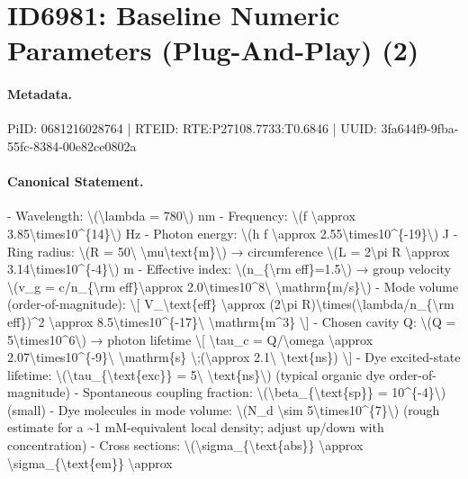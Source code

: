 \section*{ID6981: Baseline Numeric Parameters (Plug-And-Play) (2)}
\paragraph{Metadata.}
PiID: 0681216028764 | RTEID: RTE:P27108.7733:T0.6846 | UUID: 3fa644f9-9fba-55fc-8384-00e82ce0802a

\paragraph{Canonical Statement.}
- Wavelength: \textbackslash{}(\textbackslash{}lambda = 780\textbackslash{}) nm - Frequency: \textbackslash{}(f \textbackslash{}approx 3.85\textbackslash{}times10\textasciicircum{}\{14\}\textbackslash{}) Hz - Photon energy: \textbackslash{}(h f \textbackslash{}approx 2.55\textbackslash{}times10\textasciicircum{}\{-19\}\textbackslash{}) J - Ring radius: \textbackslash{}(R = 50\textbackslash{} \textbackslash{}mu\textbackslash{}text\{m\}\textbackslash{}) → circumference \textbackslash{}(L = 2\textbackslash{}pi R \textbackslash{}approx 3.14\textbackslash{}times10\textasciicircum{}\{-4\}\textbackslash{}) m - Effective index: \textbackslash{}(n\_\{\textbackslash{}rm eff\}=1.5\textbackslash{}) → group velocity \textbackslash{}(v\_g = c/n\_\{\textbackslash{}rm eff\}\textbackslash{}approx 2.0\textbackslash{}times10\textasciicircum{}8\textbackslash{} \textbackslash{}mathrm\{m/s\}\textbackslash{}) - Mode volume (order-of-magnitude): \textbackslash{}[ V\_\textbackslash{}text\{eff\} \textbackslash{}approx (2\textbackslash{}pi R)\textbackslash{}times(\textbackslash{}lambda/n\_\{\textbackslash{}rm eff\})\textasciicircum{}2 \textbackslash{}approx 8.5\textbackslash{}times10\textasciicircum{}\{-17\}\textbackslash{} \textbackslash{}mathrm\{m\textasciicircum{}3\} \textbackslash{}] - Chosen cavity Q: \textbackslash{}(Q = 5\textbackslash{}times10\textasciicircum{}6\textbackslash{}) → photon lifetime \textbackslash{}[ \textbackslash{}tau\_c = Q/\textbackslash{}omega \textbackslash{}approx 2.07\textbackslash{}times10\textasciicircum{}\{-9\}\textbackslash{} \textbackslash{}mathrm\{s\} \textbackslash{};(\textbackslash{}approx 2.1\textbackslash{} \textbackslash{}text\{ns\}) \textbackslash{}] - Dye excited-state lifetime: \textbackslash{}(\textbackslash{}tau\_\{\textbackslash{}text\{exc\}\} = 5\textbackslash{} \textbackslash{}text\{ns\}\textbackslash{}) (typical organic dye order-of-magnitude) - Spontaneous coupling fraction: \textbackslash{}(\textbackslash{}beta\_\{\textbackslash{}text\{sp\}\} = 10\textasciicircum{}\{-4\}\textbackslash{}) (small) - Dye molecules in mode volume: \textbackslash{}(N\_d \textbackslash{}sim 5\textbackslash{}times10\textasciicircum{}\{7\}\textbackslash{}) (rough estimate for a \textasciitilde{}1 mM-equivalent local density; adjust up/down with concentration) - Cross sections: \textbackslash{}(\textbackslash{}sigma\_\{\textbackslash{}text\{abs\}\} \textbackslash{}approx \textbackslash{}sigma\_\{\textbackslash{}text\{em\}\} \textbackslash{}approx 